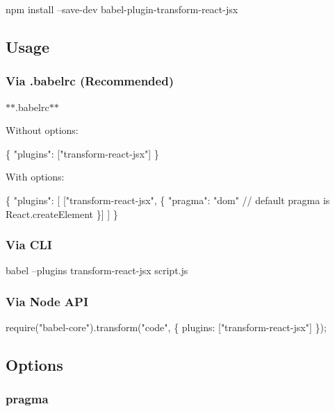 \begin{DoxyCode}
npm install --save-dev babel-plugin-transform-react-jsx
\end{DoxyCode}


\subsection*{Usage}

\subsubsection*{Via {\ttfamily .babelrc} (Recommended)}

$\ast$$\ast$.babelrc$\ast$$\ast$

Without options\+:


\begin{DoxyCode}
\{
  "plugins": ["transform-react-jsx"]
\}
\end{DoxyCode}


With options\+:


\begin{DoxyCode}
\{
  "plugins": [
    ["transform-react-jsx", \{
      "pragma": "dom" // default pragma is React.createElement
    \}]
  ]
\}
\end{DoxyCode}


\subsubsection*{Via C\+LI}


\begin{DoxyCode}
babel --plugins transform-react-jsx script.js
\end{DoxyCode}


\subsubsection*{Via Node A\+PI}


\begin{DoxyCode}
require("babel-core").transform("code", \{
  plugins: ["transform-react-jsx"]
\});
\end{DoxyCode}


\subsection*{Options}

\subsubsection*{{\ttfamily pragma}}


